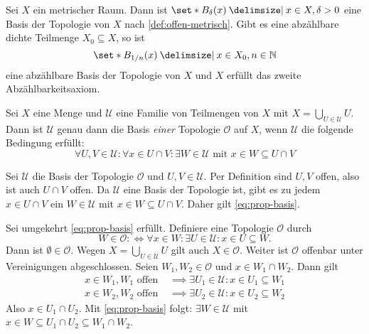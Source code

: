 \begin{beispiel}[{name=[Basis der Topologie eines metrischen Raumes]}]
	Sei $X$ ein metrischer Raum.
	Dann ist $\set*{B_\delta (x) \given x \in X, \delta > 0}$ eine Basis der Topologie von $X$ nach \cref{def:offen-metrisch}.
	Gibt es eine abzählbare dichte Teilmenge $X_0\subseteq X$, so ist
	\[
		\set*{B_{1/n}(x) \given x \in X_0, n \in \mathbb{N}}
	\]
	eine abzählbare Basis der Topologie von $X$ und $X$ erfüllt das zweite Abzählbarkeitsaxiom.
\end{beispiel}

\begin{proposition}[label=prop:basis-topo,{name=[Charakterisierung einer Basis der Topologie]}]
	Sei $X$ eine Menge und $\mathcal{U} $ eine Familie von Teilmengen von $X$ mit $X = \bigcup_{U \in \mathcal{U} } U$.
	Dann ist $\mathcal{U}$ genau dann die Basis \emph{einer} Topologie $\mathcal{O}$ auf $X$, wenn $\mathcal{U}$ die folgende Bedingung erfüllt:
	\begin{equation}
		\forall U,V \in \mathcal{U} : \forall x \in U \cap V : \exists W \in \mathcal{U}  \text{ mit } x \in W \subseteq U \cap V \label{eq:prop-basis} \tag{\#}
	\end{equation}
\end{proposition}
\begin{beweis}
	Sei $\mathcal{U} $ die Basis der Topologie $\mathcal{O} $ und $U,V \in \mathcal{U} $. 
	Per Definition sind $U,V$ offen, also ist auch $U \cap V$ offen.
	Da $\mathcal{U} $ eine Basis der Topologie ist, gibt es zu jedem $x \in U \cap V$ ein $W \in \mathcal{U} $ mit $x \in W \subseteq U \cap V$. Daher gilt \eqref{eq:prop-basis}.

	Sei umgekehrt \eqref{eq:prop-basis} erfüllt. Definiere eine Topologie $\mathcal{O}$ durch
	\[
		W \in \mathcal{O} :\Longleftrightarrow \forall x \in W : \exists U \in \mathcal{U} : x \in U \subseteq W.
	\]
	Dann ist $\emptyset \in \mathcal{O}$.
	Wegen $X = \bigcup_{U \in \mathcal{U}} U$ gilt auch $X \in \mathcal{O}$.
	Weiter ist $\mathcal{O}$ offenbar unter Vereinigungen abgeschlossen.
	Seien $W_1, W_2 \in \mathcal{O}$ und $x \in W_1 \cap W_2$. Dann gilt
	\begin{align*}
		x \in W_1, W_1 \text{ offen } &\implies  \exists U_1 \in \mathcal{U} : x \in U_1 \subseteq W_1 \\
		x \in W_2, W_2 \text{ offen } &\implies \exists U_2 \in \mathcal{U} : x \in U_2 \subseteq W_2
	\end{align*}
	Also $x \in U_1 \cap U_2$. Mit \eqref{eq:prop-basis} folgt: $\exists W \in \mathcal{U} $ mit $x \in W \subseteq U_1 \cap U_2 \subseteq W_1 \cap W_2$.
\end{beweis}

